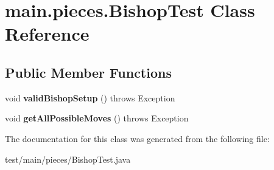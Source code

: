 \hypertarget{classmain_1_1pieces_1_1_bishop_test}{}\section{main.\+pieces.\+Bishop\+Test Class Reference}
\label{classmain_1_1pieces_1_1_bishop_test}
\subsection*{Public Member Functions}
\begin{DoxyCompactItemize}
\item 
\mbox{\label{classmain_1_1pieces_1_1_bishop_test_a753dab3698ad29264b231e2e6ca84ee7}} 
void {\bfseries valid\+Bishop\+Setup} ()  throws Exception 
\item 
\mbox{\label{classmain_1_1pieces_1_1_bishop_test_a617901a041eefbec3f4314236e5b6bbd}} 
void {\bfseries get\+All\+Possible\+Moves} ()  throws Exception 
\end{DoxyCompactItemize}


The documentation for this class was generated from the following file\+:\begin{DoxyCompactItemize}
\item 
test/main/pieces/Bishop\+Test.\+java\end{DoxyCompactItemize}
